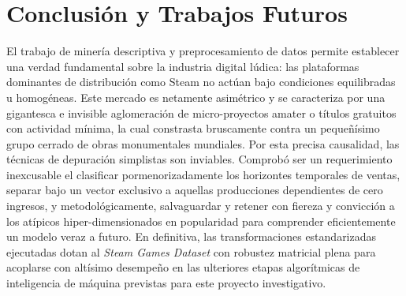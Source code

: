 \documentclass[conference]{IEEEtran}
\begin{document}
\section{Conclusión y Trabajos Futuros}
El trabajo de minería descriptiva y preprocesamiento de datos permite establecer una verdad fundamental sobre la industria digital lúdica: las plataformas dominantes de distribución como Steam no actúan bajo condiciones equilibradas u homogéneas. Este mercado es netamente asimétrico y se caracteriza por una gigantesca e invisible aglomeración de micro-proyectos amater o títulos gratuitos con actividad mínima, la cual constrasta bruscamente contra un pequeñísimo grupo cerrado de obras monumentales mundiales. Por esta precisa causalidad, las técnicas de depuración simplistas son inviables. Comprobó ser un requerimiento inexcusable el clasificar pormenorizadamente los horizontes temporales de ventas, separar bajo un vector exclusivo a aquellas producciones dependientes de cero ingresos, y metodológicamente, salvaguardar y retener con fiereza y convicción a los atípicos hiper-dimensionados en popularidad para comprender eficientemente un modelo veraz a futuro. En definitiva, las transformaciones estandarizadas ejecutadas dotan al \textit{Steam Games Dataset} con robustez matricial plena para acoplarse con altísimo desempeño en las ulteriores etapas algorítmicas de inteligencia de máquina previstas para este proyecto investigativo.







\nocite{*}


\end{document}
